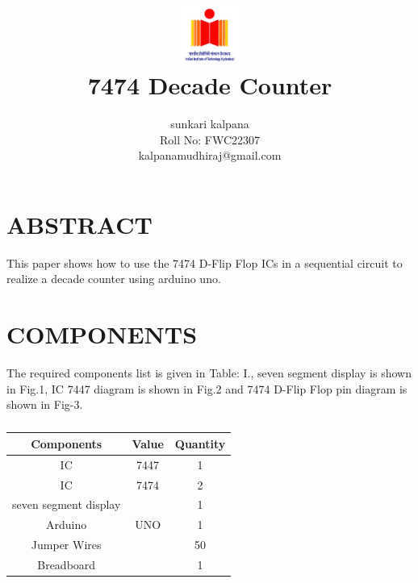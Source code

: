 \documentclass[conference]{IEEEtran}
\title{
\vspace{1cm}
{\includegraphics[width=0.15\textwidth]{ 744701.jpg} \\ 7474 Decade Counter} }
\author{sunkari kalpana \\ Roll No: FWC22307 \\ kalpanamudhiraj@gmail.com}
\begin{document}
\maketitle
 \section {ABSTRACT}
 This paper shows how to use the 7474 D-Flip Flop ICs in a sequential circuit to realize a decade counter using arduino uno.

\section{COMPONENTS}
The required components list is given in Table: I., seven segment display is shown in Fig.1, IC 7447 diagram is shown in Fig.2 and 7474 D-Flip Flop pin diagram is shown in Fig-3.
\vspace{0.3cm}
 \begin{table} [htbp]
\centering
\begin{tabular}{| c | c | c |} \hline
Components & Value & Quantity \\\hline
IC & 7447 & 1 \\ \hline
IC & 7474 & 2 \\ \hline
seven segment display & & 1\\ \hline
Arduino & UNO & 1 \\ \hline
Jumper Wires &  & 50 \\ \hline
Breadboard & & 1 \\ 
\hline
\end{tabular}
\vspace{0.3cm}
\caption{\label{tab:widgets}}
\end{table}
\end{document}

